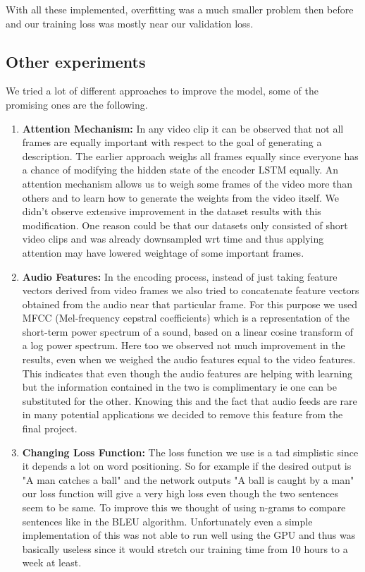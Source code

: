 \documentclass[12pt]{article}
\begin{document}
With all these implemented, overfitting was a much smaller problem then before and our training loss was mostly near our validation loss.
\subsection{Other experiments}

We tried a lot of different approaches to improve the model, some of the promising ones are the following.
\begin{enumerate}

\item \textbf{Attention Mechanism: } In any video clip it can be observed that not all frames are equally important with respect to the goal of generating a description. The earlier approach weighs all frames equally since everyone has a chance of modifying the hidden state of the encoder LSTM equally. An attention mechanism allows us to weigh some frames of the video more than others and to learn how to generate the weights from the video itself. We didn't observe extensive improvement in the dataset results with this modification. One reason could be that our datasets only consisted of short video clips and was already downsampled wrt time and thus applying attention may have lowered weightage of some important frames.
\item \textbf{Audio Features: } In the encoding process, instead of just taking feature vectors derived from video frames we also tried to concatenate feature vectors obtained from the audio near that particular frame. For this purpose we used MFCC (Mel-frequency cepstral coefficients) which is a representation of the short-term power spectrum of a sound, based on a linear cosine transform of a log power spectrum\cite{audio}. Here too we observed not much improvement in the results, even when we weighed the audio features equal to the video features. This indicates that even though the audio features are helping with learning but the information contained in the two is complimentary ie one can be substituted for the other. Knowing this and the fact that audio feeds are rare in many potential applications we decided to remove this feature from the final project.
\item \textbf{Changing Loss Function: } The loss function we use is a tad simplistic since it depends a lot on word positioning. So for example if the desired output is "A man catches a ball" and the network outputs "A ball is caught by a man" our loss function will give a very high loss even though the two sentences seem to be same. To improve this we thought of using n-grams to compare sentences like in the BLEU algorithm\cite{gnmt}. Unfortunately even a simple implementation of this was not able to run well using the GPU and thus was basically useless since it would stretch our training time from 10 hours to a week at least.
\end{enumerate}
\end{document}
